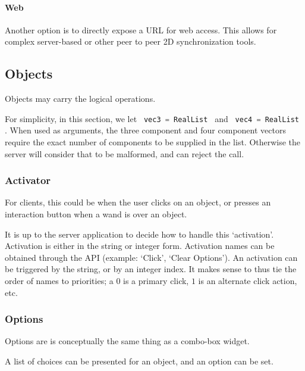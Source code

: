 \documentclass[11pt, oneside]{amsart}
\begin{document}
\paragraph{Web} Another option is to directly expose a URL for web access. This allows for complex server-based or other peer to peer 2D synchronization tools.

\subsection{Objects}
\label{sec:obj_cap}

Objects may carry the logical operations.

For simplicity, in this section, we let \lstinline[language=c++]| vec3 = RealList | and \lstinline[language=c++]| vec4 = RealList |. When used as arguments, the three component and four component vectors require the exact number of components to be supplied in the list. Otherwise the server will consider that to be malformed, and can reject the call.

\subsubsection{Activator}

For clients, this could be when the user clicks on an object, or presses an interaction button when a wand is over an object.



 It is up to the server application to decide how to handle this `activation'. Activation is either in the string or integer form. Activation names can be obtained through the API (example: `Click', `Clear Options'). An activation can be triggered by the string, or by an integer index. It makes sense to thus tie the order of names to priorities; a $0$ is a primary click, $1$ is an alternate click action, etc.

\subsubsection{Options}

Options are is conceptually the same thing as a combo-box widget.



 A list of choices can be presented for an object, and an option can be set.
\end{document}
